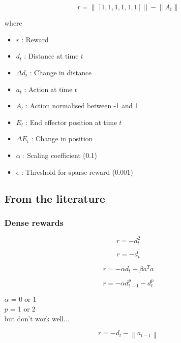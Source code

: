 \documentclass{article}
\newcommand{\norm}[1]{\left\lVert#1\right\rVert}
\begin{document}
\begin{equation}
r = \norm{[1, 1, 1, 1, 1, 1]} - \norm{A_t}
\end{equation}




where
\begin{itemize}  
\item $r$ : Reward
\item $d_t$ : Distance at time $t$ 
\item $\Delta d_t$ : Change in distance
\item $a_t$ : Action at time $t$ 
\item $A_t$ : Action normalised between -1 and 1 
\item $E_t$ : End effector position at time $t$
\item $\Delta E_t$ : Change in position
\item $\alpha$ : Scaling coefficient (0.1)
\item $\epsilon$ : Threshold for sparse reward (0.001)
\end{itemize}


\subsection{From the literature}
\subsubsection{Dense rewards}

\begin{equation}
r = - d_t^2
\end{equation}


\begin{equation}
r = - d_t
\end{equation}


\begin{equation}
r = -\alpha d_t - \beta a^T a
\end{equation}

\begin{equation}
r = -\alpha d_{t-1}^p - d_t^p 
\end{equation}

$\alpha$ = 0 or 1 \\
$p$ = 1 or 2 \\
but don't work well...

\begin{equation}
r = - d_t -  \norm{a_{t-1}}
\end{equation}
\end{document}
